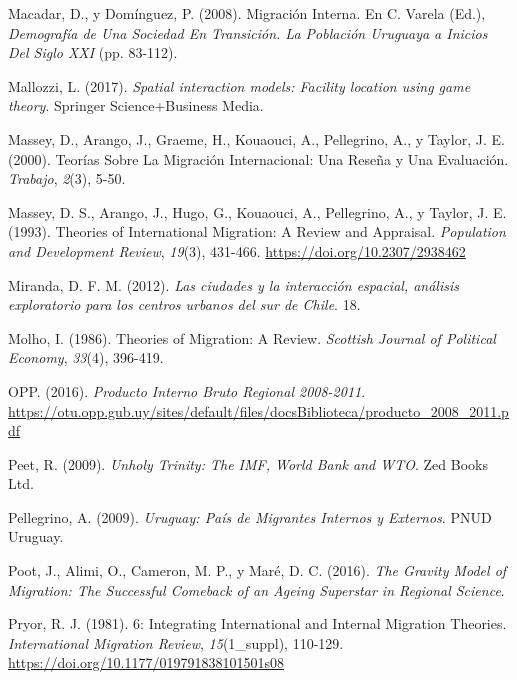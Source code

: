 \documentclass[12pt,spanish,]{article}
\begin{document}
\leavevmode\hypertarget{ref-macadar2008}{}%
Macadar, D., y Domínguez, P. (2008). Migración Interna. En C. Varela
(Ed.), \emph{Demografía de Una Sociedad En Transición. La Población
Uruguaya a Inicios Del Siglo XXI} (pp. 83-112).

\leavevmode\hypertarget{ref-mallozzi2017}{}%
Mallozzi, L. (2017). \emph{Spatial interaction models: Facility location
using game theory}. Springer Science+Business Media.

\leavevmode\hypertarget{ref-massey2000}{}%
Massey, D., Arango, J., Graeme, H., Kouaouci, A., Pellegrino, A., y
Taylor, J. E. (2000). Teorías Sobre La Migración Internacional: Una
Reseña y Una Evaluación. \emph{Trabajo}, \emph{2}(3), 5-50.

\leavevmode\hypertarget{ref-massey1993}{}%
Massey, D. S., Arango, J., Hugo, G., Kouaouci, A., Pellegrino, A., y
Taylor, J. E. (1993). Theories of International Migration: A Review and
Appraisal. \emph{Population and Development Review}, \emph{19}(3),
431-466. \url{https://doi.org/10.2307/2938462}

\leavevmode\hypertarget{ref-miranda2012}{}%
Miranda, D. F. M. (2012). \emph{Las ciudades y la interacción espacial,
análisis exploratorio para los centros urbanos del sur de Chile}. 18.

\leavevmode\hypertarget{ref-molho1986}{}%
Molho, I. (1986). Theories of Migration: A Review. \emph{Scottish
Journal of Political Economy}, \emph{33}(4), 396-419.

\leavevmode\hypertarget{ref-opp2016}{}%
OPP. (2016). \emph{Producto Interno Bruto Regional 2008-2011}.
\url{https://otu.opp.gub.uy/sites/default/files/docsBiblioteca/producto_2008_2011.pdf}

\leavevmode\hypertarget{ref-peet2009}{}%
Peet, R. (2009). \emph{Unholy Trinity: The IMF, World Bank and WTO}. Zed
Books Ltd.

\leavevmode\hypertarget{ref-pellegrino2009}{}%
Pellegrino, A. (2009). \emph{Uruguay: País de Migrantes Internos y
Externos}. PNUD Uruguay.

\leavevmode\hypertarget{ref-poot2016}{}%
Poot, J., Alimi, O., Cameron, M. P., y Maré, D. C. (2016). \emph{The
Gravity Model of Migration: The Successful Comeback of an Ageing
Superstar in Regional Science}.

\leavevmode\hypertarget{ref-pryor1981}{}%
Pryor, R. J. (1981). 6: Integrating International and Internal Migration
Theories. \emph{International Migration Review}, \emph{15}(1\_suppl),
110-129. \url{https://doi.org/10.1177/019791838101501s08}
\end{document}
